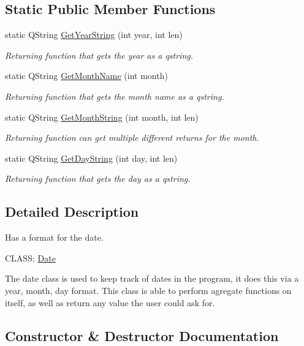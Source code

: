 \subsection*{Static Public Member Functions}
\begin{DoxyCompactItemize}
\item 
static Q\+String \hyperlink{class_date_a50c31b344978fcbf8c30029b58ec5175}{Get\+Year\+String} (int year, int len)
\begin{DoxyCompactList}\small\item\em Returning function that gets the year as a qstring. \end{DoxyCompactList}\item 
static Q\+String \hyperlink{class_date_acbe4d08337f4a2e69ffe6eacc475aeaf}{Get\+Month\+Name} (int month)
\begin{DoxyCompactList}\small\item\em Returning function that gets the month name as a qstring. \end{DoxyCompactList}\item 
static Q\+String \hyperlink{class_date_a8dee4208fce27e0f6e984aee92d3471d}{Get\+Month\+String} (int month, int len)
\begin{DoxyCompactList}\small\item\em Returning function can get multiple different returns for the month. \end{DoxyCompactList}\item 
static Q\+String \hyperlink{class_date_aa8c89f5c13d9d775fb4e6187fa0f32d9}{Get\+Day\+String} (int day, int len)
\begin{DoxyCompactList}\small\item\em Returning function that gets the day as a qstring. \end{DoxyCompactList}\end{DoxyCompactItemize}


\subsection{Detailed Description}
Has a format for the date. 

C\+L\+A\+SS\+: \hyperlink{class_date}{Date} 

 The date class is used to keep track of dates in the program, it does this via a year, month, day format. This class is able to perform agregate functions on itself, as well as return any value the user could ask for. 

\subsection{Constructor \& Destructor Documentation}
